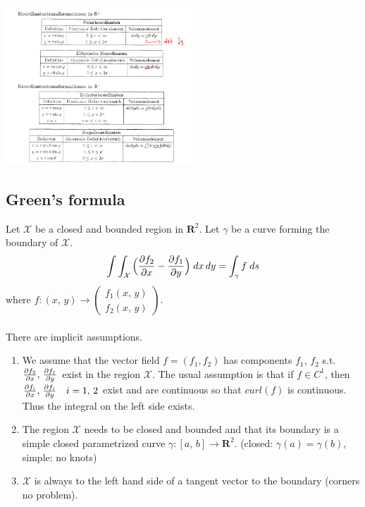 \documentclass[8pt]{extarticle}
\newcommand{\R}{{\mathbb R}}
\newcommand{\X}{{\mathcal X}}
\newcommand{\ra}{{\rightarrow}}
\def\R{\mathbf{R}}
\begin{document}
\begin{multicols*}{3}
\begin{tcolorbox}[colback=blue!5!white,colframe=blue!75!black]
\end{tcolorbox}
\begin{center}
  \includegraphics[width=7cm]{transformation.png} 
\end{center}
  \subsection{Green's formula}
  Let $\X$ be a closed and bounded region in $\R^2$.
  Let $\gamma$ be a curve forming the boundary of $\X$.
  \begin{align*}
    \int \int_\X \Big( \pdv{f_2}{x} - \pdv{f_1}{y} \Big) \; dx \, dy
    = \int_\gamma f \; ds
  \end{align*}
  where $f: (x, \, y) \ra \begin{pmatrix}
      f_1(x, \, y) \\
      f_2(x, \, y)
    \end{pmatrix}$.\\ \\
  There are implicit assumptions.
  \begin{enumerate}[label=(\arabic*)]
    \item We assume that the vector field $f= (f_1, f_2)$ has components
          $f_1, \, f_2$ s.t. $\pdv{f_2}{x}, \, \pdv{f_1}{y}$ exist
          in the region $\X$. The usual assumption is that if $f \in C^1$,
          then $\pdv{f_i}{x}, \, \pdv{f_i}{y} \quad i = 1, \, 2$ exist and are continuous
          so that $curl(f)$ is continuous. Thus the integral on the left side exists.
    \item The region $\X$ needs to be closed and bounded and that its boundary
          is a simple closed parametrized curve $\gamma: [a, \, b] \ra \R^2$.
          (closed: $\gamma(a) = \gamma(b)$, simple: no knots)
    \item $\X$ is always to the left hand side of a tangent vector to the boundary
          (corners no problem).

\end{enumerate}
\end{multicols*}
\end{document}
